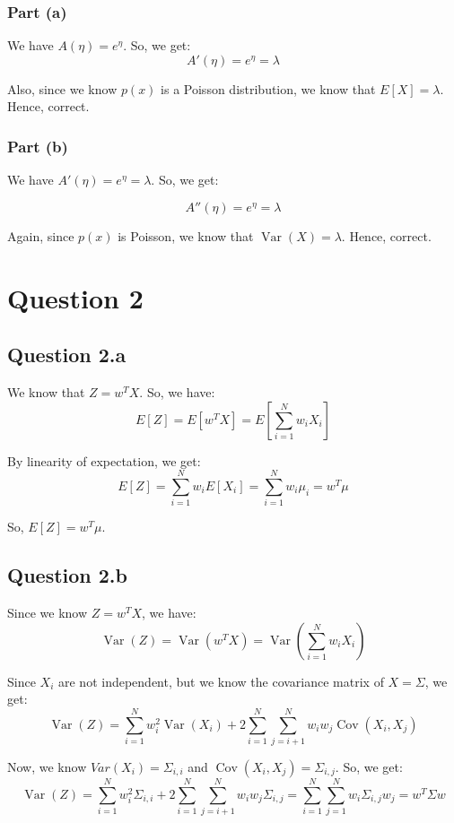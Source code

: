 \documentclass[a4paper]{article}
\begin{document}
\subsubsection*{Part (a)}
We have $A(\eta) = e^\eta$. So, we get:
\[
A'(\eta) = e^\eta = \lambda
\]

\noindent Also, since we know $p(x)$ is a Poisson distribution, we know that $E[X] = \lambda$. Hence, correct.

\subsubsection*{Part (b)}
We have $A'(\eta) = e^\eta = \lambda$. So, we get:

\[
A''(\eta) = e^\eta = \lambda
\]

\noindent Again, since $p(x)$ is Poisson, we know that $\operatorname{Var}(X) = \lambda$. Hence, correct.


\newpage
\section*{Question 2}

\subsection*{Question 2.a}
We know that $Z = w^T X$. So, we have:
\[
E[Z] = E[w^T X] = E\left[\sum_{i=1}^N w_i X_i\right]
\]

\noindent By linearity of expectation, we get:
\[
E[Z] = \sum_{i=1}^N w_i E[X_i] = \sum_{i=1}^N w_i \mu_i = w^T \mu
\]

\noindent So, $E[Z] = w^T \mu$.

\vspace{4mm}
\subsection*{Question 2.b}
Since we know $Z = w^T X$, we have:
\[
\operatorname{Var}(Z) = \operatorname{Var}(w^T X) = \operatorname{Var}{\left(\sum_{i=1}^N w_i X_i\right)}
\]

\noindent Since $X_i$ are not independent, but we know the covariance matrix of $X = \Sigma$, we get:
\[
\operatorname{Var}(Z) = \sum_{i=1}^N w_i^2 \operatorname{Var}(X_i) + 2 \sum_{i=1}^N \sum_{j=i+1}^N w_i w_j \operatorname{Cov}(X_i, X_j)
\]

\noindent Now, we know $Var(X_i) = \Sigma_{i, i}$ and $\operatorname{Cov}(X_i, X_j) = \Sigma_{i, j}$. So, we get:
\[
\operatorname{Var}(Z) = \sum_{i=1}^N w_i^2 \Sigma_{i, i} + 2 \sum_{i=1}^N \sum_{j=i+1}^N w_i w_j \Sigma_{i, j} = \sum_{i=1}^N \sum_{j=1}^N w_i \Sigma_{i, j} w_j = w^T \Sigma w
\]
\end{document}
